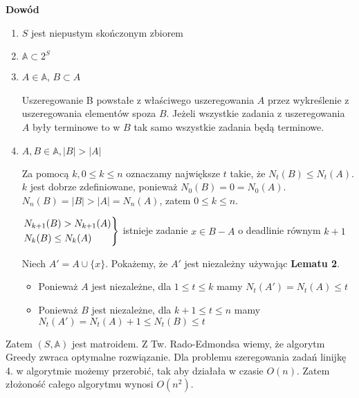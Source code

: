 \textbf{Dowód}
\begin{enumerate}
	\item $S$ jest niepustym skończonym zbiorem
	\item $\mathbb{A} \subset 2^S$
	\item $A\in\mathbb{A}$, $B \subset A$ 
	
	Uszeregowanie B powstałe z właściwego uszeregowania $A$ przez wykreślenie z uszeregowania elementów spoza $B$. Jeżeli wszystkie zadania z uszeregowania $A$ były terminowe to w $B$ tak samo wszystkie zadania będą terminowe.

	\item $A,B \in \mathbb{A}, |B| > |A|$

	Za pomocą $k, 0\leq k \leq n$ oznaczamy największe $t$ takie, że $N_t(B) \leq N_t(A)$. $k$ jest dobrze zdefiniowane, ponieważ $N_0(B) = 0 = N_0(A)$. $N_n(B) = |B| >  |A| = N_n(A)$, zatem  $0\leq k \leq n$. 
	
$\begin{drcases}
	N_{k+1}(B) > N_{k+1}(A) \\
	N_k(B) \leq N_k(A)
\end{drcases}$ istnieje zadanie $x \in B - A$ o deadlinie równym $k+1$

Niech $A' = A \cup \{x\}$. Pokażemy, że $A'$ jest niezależny używając \textbf{Lematu 2}. 
\begin{itemize}
	\item Ponieważ $A$ jest niezależne, dla $1 \leq t \leq k$ mamy $N_t(A') = N_t(A) \leq t$
	\item Ponieważ $B$ jest niezależne, dla $k+1 \leq t \leq n$ mamy $N_t(A') = N_t(A)+1 \leq N_t(B) \leq t$
\end{itemize}
\end{enumerate}
Zatem $(S,\mathbb{A})$ jest matroidem. Z Tw. Rado-Edmondsa wiemy, że algorytm Greedy zwraca optymalne rozwiązanie. Dla problemu szeregowania zadań linijkę 4. w algorytmie możemy przerobić, tak aby działała w czasie $O(n)$. Zatem złożoność całego algorytmu wynosi $O(n^2)$.

